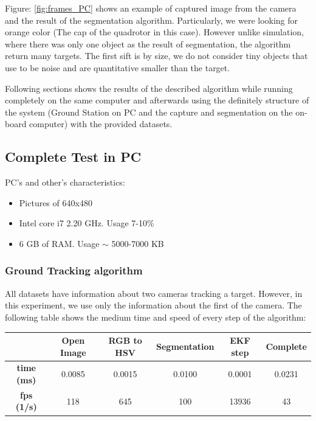 	Figure: \ref{fig:frames_PC} shows an example of captured image from the camera and the result of the segmentation algorithm. Particularly, we were looking for orange color (The cap of the quadrotor in this case). However unlike simulation, where there was only one object as the result of segmentation, the algorithm return many targets. The first sift is by size, we do not consider tiny objects that use to be noise and are quantitative smaller than the target.
		
	
	Following sections shows the results of the described algorithm while running completely on the same computer and afterwards using the definitely structure of the system (Ground Station on PC and the capture and segmentation on the on-board computer) with the provided datasets.

\subsection{Complete Test in PC}
	PC's and other's characteristics:
	\begin{itemize}
		\item{Pictures of 640x480}
		\item{Intel core i7 2.20 GHz. Usage 7-10\%}
		\item{6 GB of RAM. Usage $\sim$ 5000-7000 KB}
	\end{itemize}
	\subsubsection{Ground Tracking algorithm}
	
	All datasets have information about two cameras tracking a target. However, in this experiment, we use only the information about the first  of the camera. The following table shows the medium time and speed of every step of the algorithm: \\
	
	{
	\centering
		\begin{tabular}{|c|c|c|c|c||c|}
		\hline  					&  Open Image	&  RGB to HSV 	& Segmentation 	& EKF step  & Complete \\ 
		\hline  \textbf{time (ms)}	& 0.0085 		& 0.0015 		& 0.0100 		& 0.0001 	& 0.0231 	\\ 
		\hline  \textbf{fps (1/s)}	&  118			&  645			&  100			& 13936 	& 43 		\\ 
		\hline 
		\end{tabular} 
	}
	\newline

